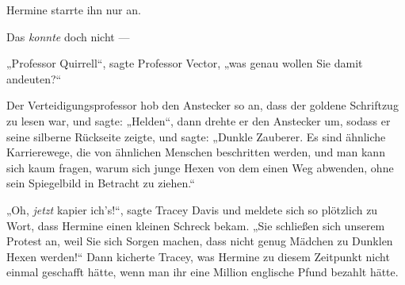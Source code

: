 Hermine starrte ihn nur an.

Das \emph{konnte} doch nicht —

„Professor Quirrell“, sagte Professor Vector, „was genau wollen Sie damit andeuten?“

Der Verteidigungsprofessor hob den Anstecker so an, dass der goldene Schriftzug \SPHEW zu lesen war, und sagte:
„Helden“, dann drehte er den Anstecker um, sodass er seine silberne Rückseite zeigte, und sagte:
„Dunkle Zauberer. Es sind ähnliche Karrierewege, die von ähnlichen Menschen beschritten werden, und man kann sich kaum fragen, warum sich junge Hexen von dem einen Weg abwenden, ohne sein Spiegelbild in Betracht zu ziehen.“

„Oh, \emph{jetzt} kapier ich’s!“, sagte Tracey Davis und meldete sich so plötzlich zu Wort, dass Hermine einen kleinen Schreck bekam.
„Sie schließen sich unserem Protest an, weil Sie sich Sorgen machen, dass nicht genug Mädchen zu Dunklen Hexen werden!“ Dann kicherte Tracey, was Hermine zu diesem Zeitpunkt nicht einmal geschafft hätte, wenn man ihr eine Million englische Pfund bezahlt hätte.

